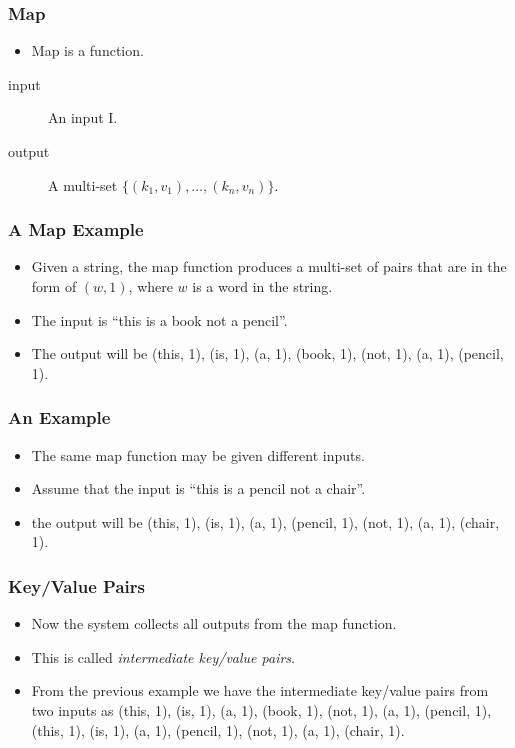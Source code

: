 \documentclass{beamer}
\begin{document}
\begin{frame}
  \frametitle{Map}
  \begin{itemize}
    \item Map is a function.
  \end{itemize}
  \begin{description}
  \item[input] An input I.
  \item[output] A multi-set $\{ (k_1, v_1), \ldots , (k_n, v_n) \}$.
  \end{description}
\end{frame}

\begin{frame}
  \frametitle{A Map Example} 
  \begin{itemize}
    \item Given a string, the map function produces a multi-set of
      pairs that are in the form of $(w, 1)$, where $w$ is a word in
      the string.
    \item The input is ``this is a book not a pencil''.
    \item The output will be (this, 1), (is, 1), (a, 1), (book,
      1), (not, 1), (a, 1), (pencil, 1).
  \end{itemize}
\end{frame}

\begin{frame}
  \frametitle{An Example} 
  \begin{itemize}
    \item The same map function may be given different inputs.
    \item Assume that the input is ``this is a pencil not a chair''.
    \item the output will be (this, 1), (is, 1), (a, 1), (pencil,
      1), (not, 1), (a, 1), (chair, 1).
  \end{itemize}
\end{frame}

\begin{frame}
  \frametitle{Key/Value Pairs}
  \begin{itemize}
    \item Now the system collects all outputs from the map function.
    \item This is called {\em intermediate key/value pairs}.
    \item From the previous example we have the intermediate key/value
      pairs from two inputs as (this, 1), (is, 1), (a, 1), (book,
      1), (not, 1), (a, 1), (pencil, 1), (this, 1), (is, 1), (a, 1),
      (pencil, 1), (not, 1), (a, 1), (chair, 1).
  \end{itemize}
\end{frame}
\end{document}
